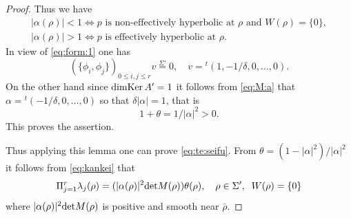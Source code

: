 \documentclass[12pt,leqno]{article} %
\def\al{\alpha}
\def\sieq{\overset{\Sigma'}{=}}
\def\bro{\bar\rho}
\def\bro{\bar\rho}
\numberwithin{equation}{section}
\begin{document}
\begin{proof}
Thus we have 
%
\begin{gather*}
|\al(\rho)|<1\Longleftrightarrow \text{$p$ is non-effectively hyperbolic at $\rho$ and $W(\rho)=\{0\}$},\\
|\al(\rho)|>1\Longleftrightarrow  \text{$p$ is effectively hyperbolic at $\rho$}.
\end{gather*}
%
 In view of \eqref{eq:form:1} one has 
%
\[
(\{\phi_i,\phi_j\})_{0\leq i,j\leq r}v\sieq 0,\quad v={^t}(1,-1/\delta,0,\ldots,0).
\]
%
On the other hand since ${\rm dim Ker\,}A'=1$ it follows from \eqref{eq:M:a} that $
\al={^t}(-1/\delta,0,\ldots,0)$ so that $\delta|\al|=1$, that is
%
\[
1+\theta=1/|\al|^2>0.
\]
%
%
This proves the assertion.

%
%
Thus applying this lemma one can prove \eqref{eq:te:seifu}.  
From $\theta=(1-|\alpha|^2)/|\alpha|^2$ it follows from \eqref{eq:kankei} that
%
\begin{equation}
\label{eq:kankei:b}
\Pi_{j=1}^r\lambda_j(\rho)=(|\al(\rho)|^2{\rm det}M(\rho))\theta(\rho),\quad \rho\in\Sigma',\;\;W(\rho)=\{0\}
\end{equation}
%
where $|\al(\rho)|^2{\rm det}M(\rho)$ is positive and smooth near $\bro$. 
\end{proof}
%
\end{document}
